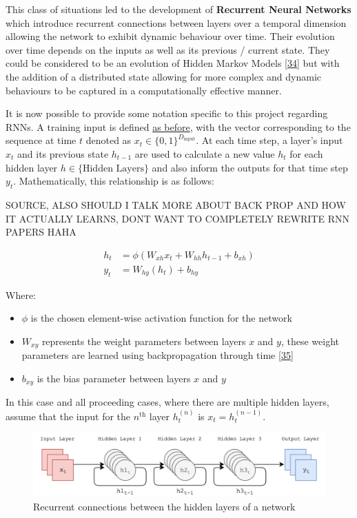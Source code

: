 \documentclass[12pt,]{article}
\providecommand{\tightlist}{%
  \setlength{\itemsep}{0pt}\setlength{\parskip}{0pt}}
\begin{document}
This class of situations led to the development of \textbf{Recurrent
Neural Networks} which introduce recurrent connections between layers
over a temporal dimension allowing the network to exhibit dynamic
behaviour over time. Their evolution over time depends on the inputs as
well as its previous / current state. They could be considered to be an
evolution of Hidden Markov Models
{[}\protect\hyperlink{ref-baum1966}{34}{]} but with the addition of a
distributed state allowing for more complex and dynamic behaviours to be
captured in a computationally effective manner.

It is now possible to provide some notation specific to this project
regarding RNNs. A training input is defined
\protect\hyperlink{buildinganeffectiverepresentation}{as before}, with
the vector corresponding to the sequence at time \(t\) denoted as
\(x_t\in \{0,1\}^{D_{\text{input}}}\). At each time step, a layer's
input \(x_t\) and its previous state \(h_{t-1}\) are used to calculate a
new value \(h_t\) for each hidden layer \(h\in\{\text{Hidden Layers}\}\)
and also inform the outputs for that time step \(y_t\). Mathematically,
this relationship is as follows:

SOURCE, ALSO SHOULD I TALK MORE ABOUT BACK PROP AND HOW IT ACTUALLY
LEARNS, DONT WANT TO COMPLETELY REWRITE RNN PAPERS HAHA

\[\begin{aligned}
h_t &= \phi(W_{xh} x_t + W_{hh} h_{t-1} + b_{xh}) \\
y_t &= W_{hy}(h_t) + b_{hy}
\end{aligned}\]

Where:

\begin{itemize}
\tightlist
\item
  \(\phi\) is the chosen element-wise activation function for the
  network
\item
  \(W_{xy}\) represents the weight parameters between layers \(x\) and
  \(y\), these weight parameters are learned using backpropagation
  through time
  {[}\protect\hyperlink{ref-werbos1990backpropagation}{35}{]}
\item
  \(b_{xy}\) is the bias parameter between layers \(x\) and \(y\)
\end{itemize}

In this case and all proceeding cases, where there are multiple hidden
layers, assume that the input for the \(n^{\text{th}}\) layer
\(h^{(n)}_t\) is \(x_t = h^{(n-1)}_t\).

\begin{figure}
\centering
\includegraphics{Images/rnn.png}
\caption{Recurrent connections between the hidden layers of a network}
\end{figure}
\end{document}
